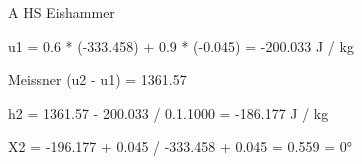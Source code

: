A HS Eishammer

u1 = 0.6 * (-333.458) + 0.9 * (-0.045) = -200.033 J / kg

Meissner (u2 - u1) = 1361.57

h2 = 1361.57 - 200.033 / 0.1.1000 = -186.177 J / kg

X2 = -196.177 + 0.045 / -333.458 + 0.045 = 0.559 = 0°